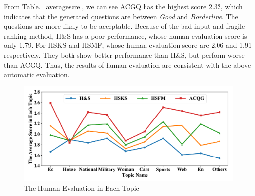 \documentclass[runningheads,UTF8,article]{comsis2}
\newcommand\revised[1]{{\color{black} #1}}
\begin{document}
	\revised{From Table.~\ref{averagescre}, we can see ACGQ has the highest score 2.32, which indicates that the generated questions are between \emph{Good} and \emph{Borderline}. The questions are more likely to be acceptable. Because of the bad input and fragile ranking method, H\&S has a poor performance, whose human evaluation score is only 1.79. 
		For HSKS and HSMF, whose human evaluation score are 2.06 and 1.91 respectively. They both show better performance than H\&S, but perform worse than ACGQ. Thus, the results of human evaluation are consistent with the above automatic evaluation.}
	
	\begin{figure}[!ht]
		\centering
		\includegraphics[width=0.8\linewidth]{classcore.pdf}
		\caption{The Human Evaluation in Each Topic}
		\label{classcore}
	\end{figure}
	
	
	
\end{document}
